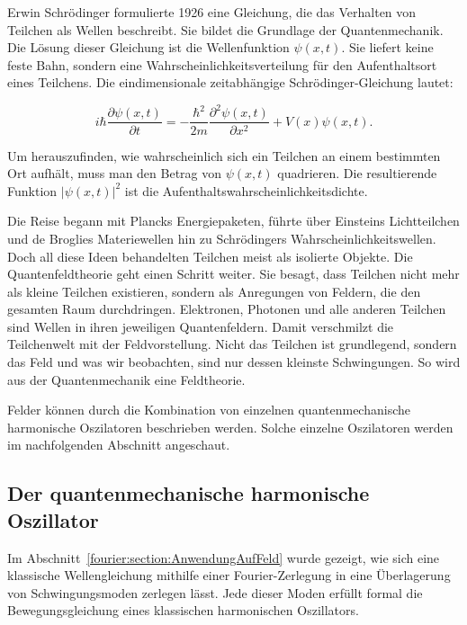Erwin Schrödinger formulierte 1926 eine Gleichung, die das Verhalten von Teilchen als Wellen beschreibt. 
%
Sie bildet die Grundlage der Quantenmechanik. Die Lösung dieser Gleichung ist die Wellenfunktion $\psi(x, t)$.
Sie liefert keine feste Bahn, sondern eine Wahrscheinlichkeitsverteilung für den Aufenthaltsort eines Teilchens.
%
Die eindimensionale zeitabhängige Schrödinger-Gleichung lautet:
%

\begin{equation}\label{fourier:equation:zeitabhaengigeSchroedingerGleichung}
	i \hbar \frac{\partial \psi(x,t)}{\partial t} = -\frac{\hbar^2}{2m} \frac{\partial^2 \psi(x,t)}{\partial x^2} + V(x) \psi(x,t).
\end{equation}


Um herauszufinden, wie wahrscheinlich sich ein Teilchen an einem bestimmten Ort aufhält, muss man den Betrag von $\psi(x, t)$ quadrieren. 
Die resultierende Funktion $|\psi(x, t)|^2$ ist die Aufenthaltswahrscheinlichkeitsdichte. 
%

Die Reise begann mit Plancks Energiepaketen, führte über Einsteins Lichtteilchen und de Broglies Materiewellen hin zu Schrödingers Wahrscheinlichkeitswellen. 
Doch all diese Ideen behandelten Teilchen meist als isolierte Objekte.
Die Quantenfeldtheorie geht einen Schritt weiter.
Sie besagt, dass Teilchen nicht mehr als kleine Teilchen existieren, sondern als Anregungen von Feldern, die den gesamten Raum durchdringen. 
Elektronen, Photonen und alle anderen Teilchen sind Wellen in ihren jeweiligen Quantenfeldern.
Damit verschmilzt die Teilchenwelt mit der Feldvorstellung.
Nicht das Teilchen ist grundlegend, sondern das Feld und was wir beobachten, sind nur dessen kleinste Schwingungen.
So wird aus der Quantenmechanik eine Feldtheorie.


Felder können durch die Kombination von einzelnen quantenmechanische harmonische Oszilatoren beschrieben werden. Solche einzelne Oszilatoren werden im nachfolgenden Abschnitt angeschaut.


\subsection{Der quantenmechanische harmonische Oszillator\label{fourier:subsection:derQMHarmonischeOszillator}}

Im Abschnitt~\ref{fourier:section:AnwendungAufFeld} wurde gezeigt, wie sich eine klassische Wellengleichung mithilfe einer Fourier-Zerlegung in eine Überlagerung von Schwingungsmoden zerlegen lässt.
Jede dieser Moden erfüllt formal die Bewegungsgleichung eines klassischen harmonischen Oszillators.

